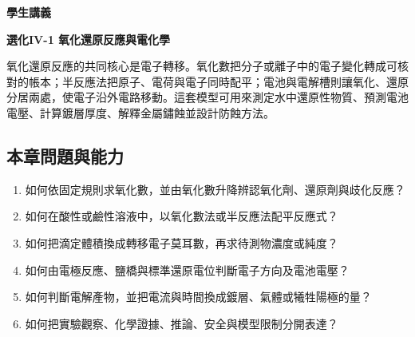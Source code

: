 \documentclass[11pt,a4paper]{article}
\providecommand{\tightlist}{%
  \setlength{\itemsep}{0pt}\setlength{\parskip}{0pt}}
\begin{document}
\begin{tcolorbox}[
  enhanced,colback=white,colframe=HandoutBlue,boxrule=1.1pt,arc=2mm,
  borderline west={3pt}{0pt}{HandoutBlue},left=5mm,right=4mm,top=4mm,bottom=4mm
]
{\sffamily\small\bfseries\color{HandoutBlue}學生講義}\par
{\sffamily\bfseries\LARGE\color{HandoutInk}選化IV-1 氧化還原反應與電化學}\par
\vspace{0.35em}{\large 以電子守恆連結氧化數、滴定、電池、電解、腐蝕與電量---物質量換算}\par
{}\par
{}\par
\end{tcolorbox}


氧化還原反應的共同核心是電子轉移。氧化數把分子或離子中的電子變化轉成可核對的帳本；半反應法把原子、電荷與電子同時配平；電池與電解槽則讓氧化、還原分居兩處，使電子沿外電路移動。這套模型可用來測定水中還原性物質、預測電池電壓、計算鍍層厚度、解釋金屬鏽蝕並設計防蝕方法。

\begin{HandoutLearningMap}

\subsection{本章問題與能力}\label{ux672cux7ae0ux554fux984cux8207ux80fdux529b}

\begin{enumerate}
\def\labelenumi{\arabic{enumi}.}
\tightlist
\item
  如何依固定規則求氧化數，並由氧化數升降辨認氧化劑、還原劑與歧化反應？
\item
  如何在酸性或鹼性溶液中，以氧化數法或半反應法配平反應式？
\item
  如何把滴定體積換成轉移電子莫耳數，再求待測物濃度或純度？
\item
  如何由電極反應、鹽橋與標準還原電位判斷電子方向及電池電壓？
\item
  如何判斷電解產物，並把電流與時間換成鍍層、氣體或犧牲陽極的量？
\item
  如何把實驗觀察、化學證據、推論、安全與模型限制分開表達？
\end{enumerate}

\end{HandoutLearningMap}
\end{document}

